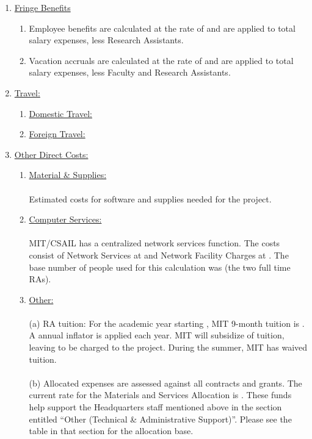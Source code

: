 \begin{enumerate}
\begin{enumerate}
\end{enumerate}

\item \underline{Fringe Benefits}

\begin{enumerate}

\item Employee benefits are calculated at the rate of \employeebenefitrate and 
are applied to total salary expenses, less Research Assistants.

\item Vacation accruals are calculated at the rate of \vacationaccrualrate and 
are applied to total salary expenses, less Faculty and Research
Assistants.

\end{enumerate}

\item \underline{Travel:}

\begin{enumerate}

\item \underline{Domestic Travel:}

\item \underline{Foreign Travel:}

\end{enumerate}

\item \underline{Other Direct Costs:}

\begin{enumerate}

\item \underline{Material \& Supplies:}\\{~}\\
Estimated costs for software and supplies needed for the project.

\item \underline{Computer Services:}\\{~}\\
MIT/CSAIL has a centralized network services function. The costs consist of Network Services at
\networkservicescost and Network Facility Charges at \networkfacilitycharges. The base number of
people used for this calculation was \numRAs (the two full time RAs).

\item \underline{Other:}\\{~}\\
(a) RA tuition: For the academic year starting \thisyear, MIT 9-month
tuition is \MITninemonthtuition. A \MITtuitioninflator annual inflator
is applied each year. MIT will subsidize \MITtuitionsubsidy of tuition,
leaving \MITtuitioncharge to be charged to the project. During the
summer, MIT has waived tuition.\\{~}\\ 
(b) Allocated expenses are assessed against all contracts and
grants. The current rate for the Materials and Services Allocation is
\msAllocation. These funds help support the Headquarters staff mentioned
above in the section entitled ``Other (Technical \& Administrative
Support)''. Please see the table in that section for the allocation
base.


\end{enumerate}
\end{enumerate}
